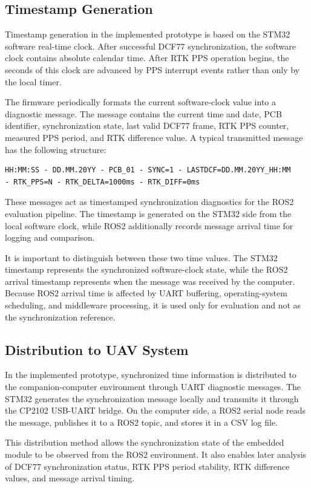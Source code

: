 \subsection{Timestamp Generation}

Timestamp generation in the implemented prototype is based on the STM32 software real-time clock. After successful DCF77 synchronization, the software clock contains absolute calendar time. After RTK PPS operation begins, the seconds of this clock are advanced by PPS interrupt events rather than only by the local timer.

The firmware periodically formats the current software-clock value into a diagnostic message. The message contains the current time and date, PCB identifier, synchronization state, last valid DCF77 frame, RTK PPS counter, measured PPS period, and RTK difference value. A typical transmitted message has the following structure:
\begin{verbatim}
HH:MM:SS - DD.MM.20YY - PCB_01 - SYNC=1 - LASTDCF=DD.MM.20YY_HH:MM
- RTK_PPS=N - RTK_DELTA=1000ms - RTK_DIFF=0ms
\end{verbatim}
These messages act as timestamped synchronization diagnostics for the ROS2 evaluation pipeline. The timestamp is generated on the STM32 side from the local software clock, while ROS2 additionally records message arrival time for logging and comparison.

It is important to distinguish between these two time values. The STM32 timestamp represents the synchronized software-clock state, while the ROS2 arrival timestamp represents when the message was received by the computer. Because ROS2 arrival time is affected by UART buffering, operating-system scheduling, and middleware processing, it is used only for evaluation and not as the synchronization reference.

\subsection{Distribution to UAV System}

In the implemented prototype, synchronized time information is distributed to the companion-computer environment through UART diagnostic messages. The STM32 generates the synchronization message locally and transmits it through the CP2102 USB-UART bridge. On the computer side, a ROS2 serial node reads the message, publishes it to a ROS2 topic, and stores it in a CSV log file.

This distribution method allows the synchronization state of the embedded module to be observed from the ROS2 environment. It also enables later analysis of DCF77 synchronization status, RTK PPS period stability, RTK difference values, and message arrival timing.

